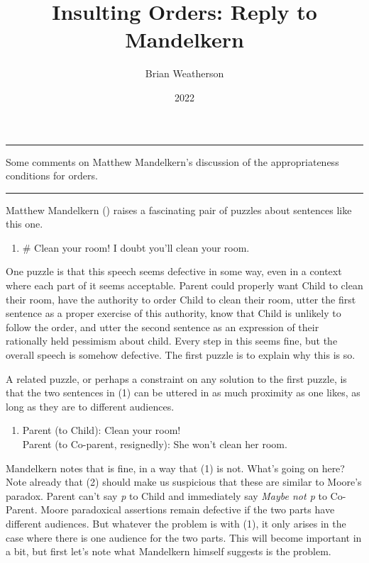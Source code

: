 \documentclass[
  10pt,
  letterpaper,
  DIV=11,
  numbers=noendperiod,
  twoside]{scrartcl}
\title{Insulting Orders: Reply to Mandelkern}
\author{Brian Weatherson}
\date{2022}
\providecommand{\tightlist}{%
  \setlength{\itemsep}{0pt}\setlength{\parskip}{0pt}}\usepackage{longtable,booktabs,array}
\renewenvironment{abstract}
 {\vspace{-1.25cm}
 \quotation\small\noindent\rule{\linewidth}{.5pt}\par\smallskip
 \noindent }
 {\par\noindent\rule{\linewidth}{.5pt}\endquotation}
\begin{document}
\maketitle
\begin{abstract}
Some comments on Matthew Mandelkern's discussion of the appropriateness
conditions for orders.
\end{abstract}

Matthew Mandelkern () raises a
fascinating pair of puzzles about sentences like this one.

\begin{enumerate}
\def\labelenumi{(\arabic{enumi})}
\tightlist
\item
  \# Clean your room! I doubt you'll clean your room.
\end{enumerate}

One puzzle is that this speech seems defective in some way, even in a
context where each part of it seems acceptable. Parent could properly
want Child to clean their room, have the authority to order Child to
clean their room, utter the first sentence as a proper exercise of this
authority, know that Child is unlikely to follow the order, and utter
the second sentence as an expression of their rationally held pessimism
about child. Every step in this seems fine, but the overall speech is
somehow defective. The first puzzle is to explain why this is so.

A related puzzle, or perhaps a constraint on any solution to the first
puzzle, is that the two sentences in (1) can be uttered in as much
proximity as one likes, as long as they are to different audiences.

\begin{enumerate}
\def\labelenumi{(\arabic{enumi})}
\setcounter{enumi}{1}
\tightlist
\item
  Parent (to Child): Clean your room!\\
  Parent (to Co-parent, resignedly): She won't clean her room.
\end{enumerate}

Mandelkern notes that is fine, in a way that (1) is not. What's going on
here? Note already that (2) should make us suspicious that these are
similar to Moore's paradox. Parent can't say \emph{p} to Child and
immediately say \emph{Maybe not p} to Co-Parent. Moore paradoxical
assertions remain defective if the two parts have different audiences.
But whatever the problem is with (1), it only arises in the case where
there is one audience for the two parts. This will become important in a
bit, but first let's note what Mandelkern himself suggests is the
problem.
\end{document}
